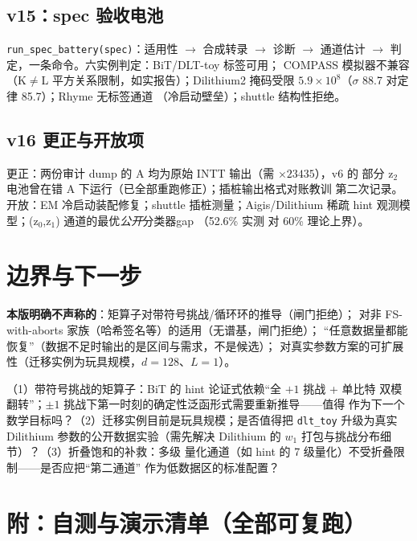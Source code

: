 \documentclass[11pt,a4paper]{ctexart}
\begin{document}
\subsection{v15：spec 验收电池}

\texttt{run\_spec\_battery(spec)}：适用性 $\to$ 合成转录 $\to$ 诊断 $\to$
通道估计 $\to$ 判定，一条命令。六实例判定：BiT/DLT-toy 标签可用；
COMPASS 模拟器不兼容（K$\ne$L 平方关系限制，如实报告）；Dilithium2
掩码受限 $5.9\times10^8$（$\sigma$ 88.7 对定律 85.7）；Rhyme 无标签通道
（冷启动壁垒）；shuttle 结构性拒绝。

\subsection{v16 更正与开放项}

更正：两份审计 dump 的 A 均为原始 INTT 输出（需 $\times23435$），v6 的
部分 z$_2$ 电池曾在错 A 下运行（已全部重跑修正）；插桩输出格式对账教训
第二次记录。开放：EM 冷启动装配修复；shuttle 插桩测量；Aigis/Dilithium
稀疏 hint 观测模型；(z$_0$,z$_1$) 通道的最优\emph{公开}分类器gap
（52.6\% 实测 对 60\% 理论上界）。

\section{边界与下一步}

\textbf{本版明确不声称的}：矩算子对带符号挑战/循环环的推导（闸门拒绝）；
对非 FS-with-aborts 家族（哈希签名等）的适用（无谱基，闸门拒绝）；
``任意数据量都能恢复''（数据不足时输出的是区间与需求，不是候选）；
对真实参数方案的可扩展性（迁移实例为玩具规模，$d{=}128$、$L{=}1$）。

\begin{askbox}[征求建议]
（1）带符号挑战的矩算子：BiT 的 hint 论证式依赖``全 $+1$ 挑战 + 单比特
双模翻转''；$\pm1$ 挑战下第一时刻的确定性泛函形式需要重新推导——值得
作为下一个数学目标吗？（2）迁移实例目前是玩具规模；是否值得把
\texttt{dlt\_toy} 升级为真实 Dilithium 参数的公开数据实验（需先解决
Dilithium 的 $w_1$ 打包与挑战分布细节）？（3）折叠饱和的补救：多级
量化通道（如 hint 的 7 级量化）不受折叠限制——是否应把``第二通道''
作为低数据区的标准配置？
\end{askbox}

\section{附：自测与演示清单（全部可复跑）}
\end{document}
